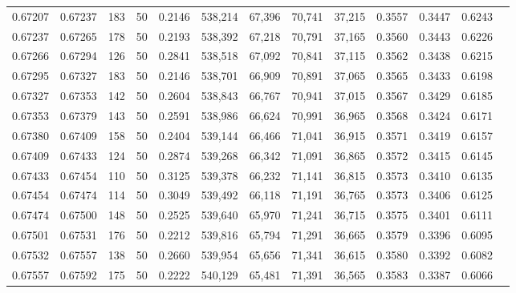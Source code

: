 \begin{tabular}{rrrrrrrrrrrrr}
0.67207 & 0.67237 &   183 &  50 &                                     0.2146 & 538,214 &  67,396 &  70,741 &  37,215 & 0.3557 & 0.3447 & 0.6243 \\
0.67237 & 0.67265 &   178 &  50 &                                     0.2193 & 538,392 &  67,218 &  70,791 &  37,165 & 0.3560 & 0.3443 & 0.6226 \\
0.67266 & 0.67294 &   126 &  50 &                                     0.2841 & 538,518 &  67,092 &  70,841 &  37,115 & 0.3562 & 0.3438 & 0.6215 \\
0.67295 & 0.67327 &   183 &  50 &                                     0.2146 & 538,701 &  66,909 &  70,891 &  37,065 & 0.3565 & 0.3433 & 0.6198 \\
0.67327 & 0.67353 &   142 &  50 &                                     0.2604 & 538,843 &  66,767 &  70,941 &  37,015 & 0.3567 & 0.3429 & 0.6185 \\
0.67353 & 0.67379 &   143 &  50 &                                     0.2591 & 538,986 &  66,624 &  70,991 &  36,965 & 0.3568 & 0.3424 & 0.6171 \\
0.67380 & 0.67409 &   158 &  50 &                                     0.2404 & 539,144 &  66,466 &  71,041 &  36,915 & 0.3571 & 0.3419 & 0.6157 \\
0.67409 & 0.67433 &   124 &  50 &                                     0.2874 & 539,268 &  66,342 &  71,091 &  36,865 & 0.3572 & 0.3415 & 0.6145 \\
0.67433 & 0.67454 &   110 &  50 &                                     0.3125 & 539,378 &  66,232 &  71,141 &  36,815 & 0.3573 & 0.3410 & 0.6135 \\
0.67454 & 0.67474 &   114 &  50 &                                     0.3049 & 539,492 &  66,118 &  71,191 &  36,765 & 0.3573 & 0.3406 & 0.6125 \\
0.67474 & 0.67500 &   148 &  50 &                                     0.2525 & 539,640 &  65,970 &  71,241 &  36,715 & 0.3575 & 0.3401 & 0.6111 \\
0.67501 & 0.67531 &   176 &  50 &                                     0.2212 & 539,816 &  65,794 &  71,291 &  36,665 & 0.3579 & 0.3396 & 0.6095 \\
0.67532 & 0.67557 &   138 &  50 &                                     0.2660 & 539,954 &  65,656 &  71,341 &  36,615 & 0.3580 & 0.3392 & 0.6082 \\
0.67557 & 0.67592 &   175 &  50 &                                     0.2222 & 540,129 &  65,481 &  71,391 &  36,565 & 0.3583 & 0.3387 & 0.6066 \\

\end{tabular}
